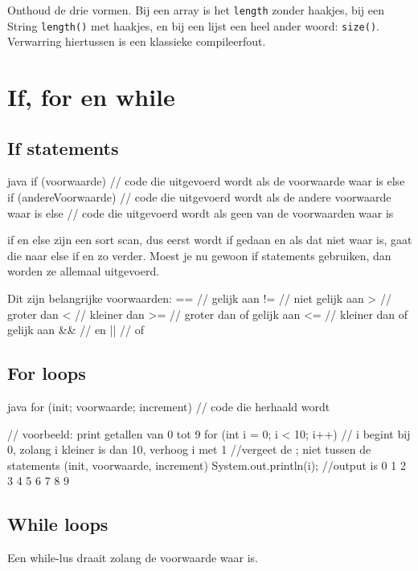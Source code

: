 \documentclass[a4paper,11pt]{article}
\begin{document}
\begin{examenbox}
    Onthoud de drie vormen. Bij een array is het \texttt{length} zonder haakjes, bij
    een String \texttt{length()} met haakjes, en bij een lijst een heel ander woord:
    \texttt{size()}. Verwarring hiertussen is een klassieke compileerfout.
\end{examenbox}

\section{If, for en while}
\subsection{If statements}
\begin{codeblock}[if statement]{java}
    if (voorwaarde) {
            // code die uitgevoerd wordt als de voorwaarde waar is
        } else if (andereVoorwaarde)
    {
            // code die uitgevoerd wordt als de andere voorwaarde waar is
        } else
        {
            // code die uitgevoerd wordt als geen van de voorwaarden waar is
        }

    if en else zijn een sort scan, dus eerst wordt if gedaan en als
    dat niet waar is, gaat die naar else if en zo verder.
    Moest je nu gewoon if statements gebruiken, dan worden ze allemaal
    uitgevoerd.

    Dit zijn belangrijke voorwaarden:
    ==  // gelijk aan
    !=  // niet gelijk aan
    >   // groter dan
    <   // kleiner dan
    >=  // groter dan of gelijk aan
    <=  // kleiner dan of gelijk aan
    &&  // en
    ||  // of
\end{codeblock}

\subsection{For loops}
\begin{codeblock}{java}
    for (init; voorwaarde; increment)
    {
            // code die herhaald wordt
        }

    // voorbeeld: print getallen van 0 tot 9
    for (int i = 0; i < 10; i++) // i begint bij 0, zolang i kleiner is dan 10, verhoog i met 1
    //vergeet de ; niet tussen de statements (init, voorwaarde, increment)
    {
            System.out.println(i); //output is 0 1 2 3 4 5 6 7 8 9
        }
\end{codeblock}

\subsection{While loops}
Een while-lus draait zolang de voorwaarde waar is.
\end{document}
